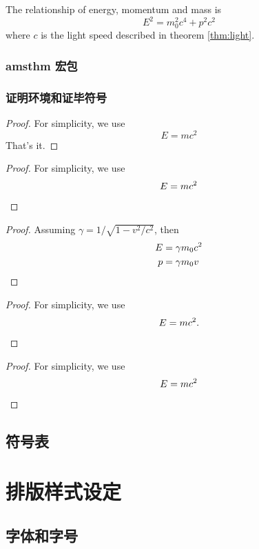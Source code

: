 \documentclass[12pt,UTF8]{ctexart}%
\begin{document}
\begin{mythm}
The relationship of energy,
momentum and mass is
\[E^2 = m_0^2 c^4 + p^2 c^2\]
where $c$ is the light speed
described in theorem \ref{thm:light}.
\end{mythm}

\subsubsection{amsthm 宏包}


\subsubsection{证明环境和证毕符号}

\begin{proof}
For simplicity, we use
\[
E=mc^2
\]
That's it.
\end{proof}

\begin{proof}
For simplicity, we use
\[
E=mc^2 \qedhere
\]
\end{proof}

\begin{proof}
Assuming $\gamma
= 1/\sqrt{1-v^2/c^2}$, then
\begin{align*}
E &= \gamma m_0 c^2 \\
p &= \gamma m_0v \qedhere
\end{align*}
\end{proof}

\begin{proof}
For simplicity, we use
\begin{equation}
E=mc^2.\qedhere
\end{equation}
\end{proof}

\renewcommand{\qedsymbol}%
{\rule{1ex}{1.5ex}}
\begin{proof}
For simplicity, we use
\[
E=mc^2 \qedhere
\]
\end{proof}

\subsection{符号表}


\section{排版样式设定}

\subsection{字体和字号}
\end{document}
